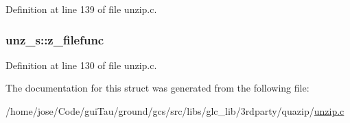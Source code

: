Definition at line 139 of file unzip.\-c.

\hypertarget{structunz__s_a7be6cd9deaecd46f98f462bf6594baf1}{
\subsubsection[{z\-\_\-filefunc}]{ unz\-\_\-s\-::z\-\_\-filefunc}}\label{structunz__s_a7be6cd9deaecd46f98f462bf6594baf1}


Definition at line 130 of file unzip.\-c.



The documentation for this struct was generated from the following file\-:\begin{DoxyCompactItemize}
\item 
/home/jose/\-Code/gui\-Tau/ground/gcs/src/libs/glc\-\_\-lib/3rdparty/quazip/\hyperlink{unzip_8c}{unzip.\-c}\end{DoxyCompactItemize}
